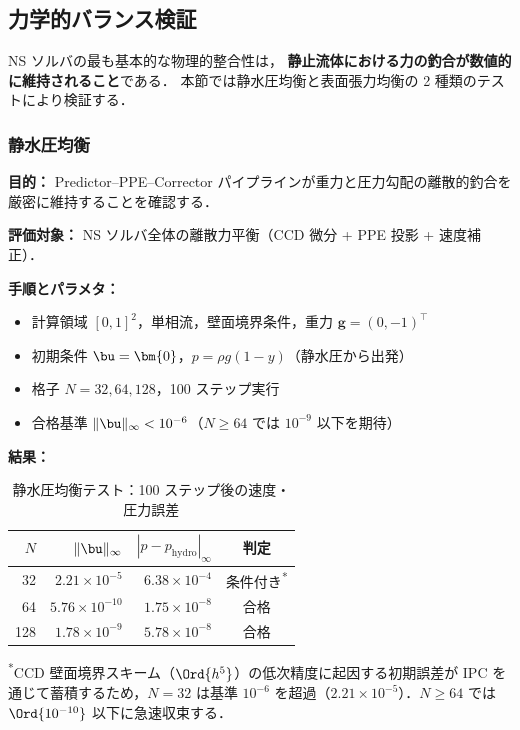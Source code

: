 %
\subsection{力学的バランス検証}
\label{sec:force_balance}

NS ソルバの最も基本的な物理的整合性は，
\textbf{静止流体における力の釣合が数値的に維持されること}である．
本節では静水圧均衡と表面張力均衡の 2 種類のテストにより検証する．

\subsubsection{静水圧均衡}
\label{sec:hydrostatic}

\noindent\textbf{目的：}
Predictor--PPE--Corrector パイプラインが重力と圧力勾配の離散的釣合を
厳密に維持することを確認する．

\noindent\textbf{評価対象：}
NS ソルバ全体の離散力平衡（CCD 微分 + PPE 投影 + 速度補正）．

\noindent\textbf{手順とパラメタ：}
\begin{itemize}[noitemsep]
  \item 計算領域 $[0,1]^2$，単相流，壁面境界条件，重力 $\bm{g} = (0, -1)^\top$
  \item 初期条件 $\bu = \bm{0}$，$p = \rho g (1-y)$（静水圧から出発）
  \item 格子 $N = 32, 64, 128$，100 ステップ実行
  \item 合格基準 $\|\bu\|_\infty < 10^{-6}$（$N \geq 64$ では $10^{-9}$ 以下を期待）
\end{itemize}

\noindent\textbf{結果：}

\begin{table}[htbp]
\centering
\caption{静水圧均衡テスト：100 ステップ後の速度・圧力誤差}
\label{tab:hydrostatic}
\renewcommand{\arraystretch}{1.3}
\begin{tabular}{rrrc}
\toprule
$N$ & $\|\bu\|_\infty$ & $|p - p_{\mathrm{hydro}}|_\infty$ & 判定 \\
\midrule
32  & $2.21 \times 10^{-5}$ & $6.38 \times 10^{-4}$ & 条件付き\textsuperscript{*} \\
64  & $5.76 \times 10^{-10}$ & $1.75 \times 10^{-8}$ & 合格 \\
128 & $1.78 \times 10^{-9}$ & $5.78 \times 10^{-8}$ & 合格 \\
\bottomrule
\end{tabular}
{\footnotesize \textsuperscript{*}CCD 壁面境界スキーム（$\Ord{h^5}$）の低次精度に起因する初期誤差が IPC を通じて蓄積するため，$N{=}32$ は基準 $10^{-6}$ を超過（$2.21 \times 10^{-5}$）．$N{\geq}64$ では $\Ord{10^{-10}}$ 以下に急速収束する．}
\end{table}

